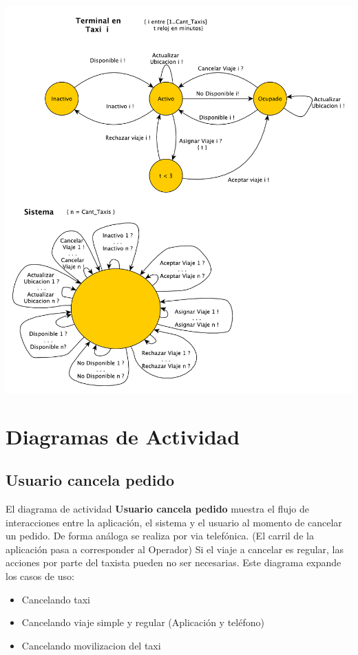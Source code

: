 \documentclass[a4paper]{article}
\begin{document}
\begin{center}
\includegraphics[scale=0.7]{diag_FSM.pdf}
\end{center}

\clearpage
\section{Diagramas de Actividad}
\subsection{Usuario cancela pedido}
El diagrama de actividad \textbf{Usuario cancela pedido} muestra el flujo de interacciones entre la aplicaci\'on, el sistema y el usuario 
al momento de cancelar un pedido. De forma an\'aloga se realiza por via telef\'onica. (El carril de la aplicaci\'on pasa a corresponder al Operador)
Si el viaje a cancelar es regular, las acciones por parte del taxista pueden no ser necesarias.
Este diagrama expande los casos de uso:
\begin{itemize}
\item Cancelando taxi
\item Cancelando viaje simple y regular (Aplicaci\'on y tel\'efono)
\item Cancelando movilizacion del taxi
\end{itemize}
\end{document}
